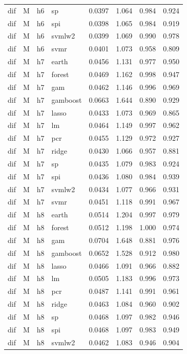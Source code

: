 \begin{ThreePartTable}
\begin{longtable}[t]{llclcccc}
dif & M & h6 & sp & 0.0397 & 1.064 & 0.984 & 0.924\\
dif & M & h6 & spi & 0.0398 & 1.065 & 0.984 & 0.919\\
dif & M & h6 & svmlw2 & 0.0399 & 1.069 & 0.990 & 0.978\\
dif & M & h6 & svmr & 0.0401 & 1.073 & 0.958 & 0.809\\
\addlinespace
dif & M & h7 & earth & 0.0456 & 1.131 & 0.977 & 0.950\\
dif & M & h7 & forest & 0.0469 & 1.162 & 0.998 & 0.947\\
dif & M & h7 & gam & 0.0462 & 1.146 & 0.996 & 0.969\\
dif & M & h7 & gamboost & 0.0663 & 1.644 & 0.890 & 0.929\\
dif & M & h7 & lasso & 0.0433 & 1.073 & 0.969 & 0.865\\
dif & M & h7 & lm & 0.0464 & 1.149 & 0.997 & 0.962\\
dif & M & h7 & pcr & 0.0455 & 1.129 & 0.972 & 0.927\\
dif & M & h7 & ridge & 0.0430 & 1.066 & 0.957 & 0.881\\
dif & M & h7 & sp & 0.0435 & 1.079 & 0.983 & 0.924\\
dif & M & h7 & spi & 0.0436 & 1.080 & 0.984 & 0.939\\
dif & M & h7 & svmlw2 & 0.0434 & 1.077 & 0.966 & 0.931\\
dif & M & h7 & svmr & 0.0451 & 1.118 & 0.991 & 0.967\\
\addlinespace
dif & M & h8 & earth & 0.0514 & 1.204 & 0.997 & 0.979\\
dif & M & h8 & forest & 0.0512 & 1.198 & 1.000 & 0.974\\
dif & M & h8 & gam & 0.0704 & 1.648 & 0.881 & 0.976\\
dif & M & h8 & gamboost & 0.0652 & 1.528 & 0.912 & 0.980\\
dif & M & h8 & lasso & 0.0466 & 1.091 & 0.966 & 0.882\\
dif & M & h8 & lm & 0.0505 & 1.183 & 0.996 & 0.973\\
dif & M & h8 & pcr & 0.0487 & 1.141 & 0.991 & 0.961\\
dif & M & h8 & ridge & 0.0463 & 1.084 & 0.960 & 0.902\\
dif & M & h8 & sp & 0.0468 & 1.097 & 0.982 & 0.946\\
dif & M & h8 & spi & 0.0468 & 1.097 & 0.983 & 0.949\\
dif & M & h8 & svmlw2 & 0.0462 & 1.083 & 0.946 & 0.904\\

\end{longtable}
\end{ThreePartTable}
